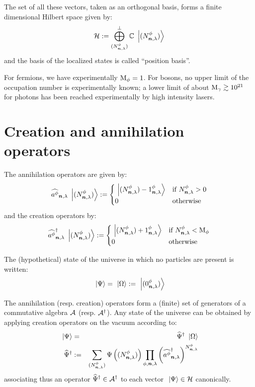 \documentclass[10pt,a4paper,twoside,openany]{book}
\begin{document}
The set of all these vectors, taken as an orthogonal basis, forms a finite dimensional Hilbert space given by:
\begin{equation*}
\mathcal H := \bigoplus^\perp_{({N}^{\phi}_{{\boldsymbol{n}}, {\lambda}})} \mathbb{C} \ \left|{({N}^{\phi}_{{\boldsymbol{n}}, {\lambda}})}\right\rangle
\end{equation*}
and the basis of the localized states is called ``position basis''.

 For fermions, we have experimentally $\mathrm M_{\phi} = 1$. For bosons, no upper limit of the occupation number is experimentally known; a lower limit of about $\mathrm M_{\gamma} \gtrsim 10^{21}$ for photons has been reached experimentally by high intensity lasers.

\section{Creation and annihilation operators}

 The annihilation operators are given by:
\begin{equation*}
\widehat{a^{\phi}}_{{\boldsymbol{n}}, {\lambda}} \ \left|{({N}^{\phi}_{{\boldsymbol{n}}, {\lambda}})}\right\rangle := \begin{cases}
\ \left|{({N}^{\phi}_{{\boldsymbol{n}}, {\lambda}}) - {1}^{\phi}_{{\boldsymbol{n}}, {\lambda}}}\right\rangle & \text{if ${N}^{\phi}_{{\boldsymbol{n}}, {\lambda}} > 0$} \\
0 & \text{otherwise}
\end{cases}
\end{equation*}
and the creation operators by:
\begin{equation*}
\widehat{a^{\phi}}^{\dagger}_{{\boldsymbol{n}}, {\lambda}} \ \left|{({N}^{\phi}_{{\boldsymbol{n}}, {\lambda}})}\right\rangle := \begin{cases}
\ \left|{({N}^{\phi}_{{\boldsymbol{n}}, {\lambda}}) + {1}^{\phi}_{{\boldsymbol{n}}, {\lambda}}}\right\rangle & \text{if ${N}^{\phi}_{{\boldsymbol{n}}, {\lambda}} < \mathrm M_{\phi}$} \\
0 & \text{otherwise}
\end{cases}
\end{equation*}

The (hypothetical) state of the universe in which no particles are present is written:
\begin{equation*}
\ \left|{\Psi}\right\rangle = \ \left|{\Omega}\right\rangle := \ \left|{({0}^{\phi}_{{\boldsymbol{n}}, {\lambda}})}\right\rangle
\end{equation*}

 The annihilation (resp. creation) operators form a (finite) set of generators of a commutative algebra $\mathcal A$ (resp. $\mathcal A^{\dagger}$). Any state of the universe can be obtained by applying creation operators on the vacuum according to:
\begin{eqnarray*}
\ \left|{\Psi}\right\rangle & = & \widehat{\Psi}^{\dagger} \ \left|{\Omega}\right\rangle \\
\widehat{\Psi}^{\dagger} & := & \sum_{({N}^{\phi}_{{\boldsymbol{n}}, {\lambda}})} \Psi \left(({N}^{\phi}_{{\boldsymbol{n}}, {\lambda}}) \right) \prod_{\phi,\boldsymbol{n},\lambda} \left( \widehat{a^{\phi}}^{\dagger}_{{\boldsymbol{n}}, {\lambda}} \right)^{{N}^{\phi}_{{\boldsymbol{n}}, {\lambda}}}
\end{eqnarray*}
associating thus an operator $\widehat{\Psi}^{\dagger} \in \mathcal A^{\dagger}$ to each vector $\ \left|{\Psi}\right\rangle \in \mathcal H$ canonically.
\end{document}
